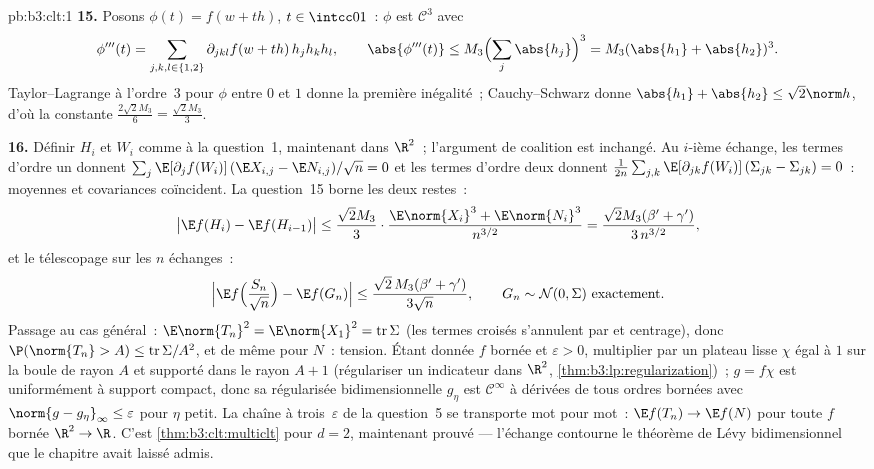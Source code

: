 \begin{solution}{pb:b3:clt:1}
\textbf{15.} Posons $\phi(t) = f(w + th)$, $t \in \intcc01$~:
$\phi$ est $\mathcal C^3$ avec
\[
\phi'''(t) = \sum_{j,k,l\in\{1,2\}}\partial_{jkl}f(w +
th)\,h_jh_kh_l, \qquad \abs{\phi'''(t)} \leq
M_3\Bigl(\sum_j\abs{h_j}\Bigr)^3 = M_3(\abs{h_1} +
\abs{h_2})^3 .
\]
Taylor--Lagrange à l'ordre~$3$ pour $\phi$ entre $0$ et $1$
donne la première inégalité~; Cauchy--Schwarz donne
$\abs{h_1} + \abs{h_2} \leq \sqrt2\norm h$, d'où la
constante $\frac{2\sqrt2M_3}6 = \frac{\sqrt2M_3}3$.

\textbf{16.} Définir $H_i$ et $W_i$ comme à la question~1,
maintenant dans $\R^2$~; l'argument de coalition est
inchangé. Au $i$-ième échange, les termes d'ordre un donnent
$\sum_j\E[\partial_jf(W_i)]\,(\E X_{i,j} - \E N_{i,j})/
\sqrt n = 0$ et les termes d'ordre deux donnent
$\frac1{2n}\sum_{j,k}\E[\partial_{jk}f(W_i)]\,(\Sigma_{jk}
- \Sigma_{jk}) = 0$~: moyennes et covariances coïncident. La
question~15 borne les deux restes~:
\[
\bigl|\E f(H_i) - \E f(H_{i-1})\bigr| \leq
\frac{\sqrt2M_3}3\cdot\frac{\E\norm{X_i}^3 +
\E\norm{N_i}^3}{n^{3/2}}
= \frac{\sqrt2M_3(\beta' + \gamma')}{3\,n^{3/2}},
\]
et le télescopage sur les $n$ échanges~:
\[
\Bigl|\E f\Bigl(\frac{S_n}{\sqrt n}\Bigr) - \E
f(G_n)\Bigr| \leq \frac{\sqrt2\,M_3(\beta' +
\gamma')}{3\sqrt n},
\qquad G_n \sim \mathcal N(0, \Sigma)\ \text{exactement} .
\]
Passage au cas général~: $\E\norm{T_n}^2 = \E\norm{X_1}^2 =
\operatorname{tr}\Sigma$ (les termes croisés s'annulent par
 et centrage), donc $\P(\norm{T_n} > A) \leq
\operatorname{tr}\Sigma/A^2$, et de même pour $N$~:
tension. Étant donnée $f$  bornée et $\varepsilon
> 0$, multiplier par un plateau lisse $\chi$ égal à $1$ sur
la boule de rayon $A$ et supporté dans le rayon $A + 1$
(régulariser un indicateur dans $\R^2$,
\cref{thm:b3:lp:regularization})~; $g = f\chi$ est
uniformément  à support compact, donc sa
régularisée bidimensionnelle $g_\eta$ est $\mathcal
C^\infty$ à dérivées de tous ordres bornées avec $\norm{g -
g_\eta}_\infty \leq \varepsilon$ pour $\eta$ petit. La
chaîne à trois~$\varepsilon$ de la question~5 se transporte
mot pour mot~: $\E f(T_n) \to \E f(N)$ pour toute $f$
 bornée $\R^2 \to \R$. C'est
\cref{thm:b3:clt:multiclt} pour $d = 2$, maintenant
prouvé --- l'échange contourne le théorème de Lévy
bidimensionnel que le chapitre avait laissé admis.


\end{solution}
